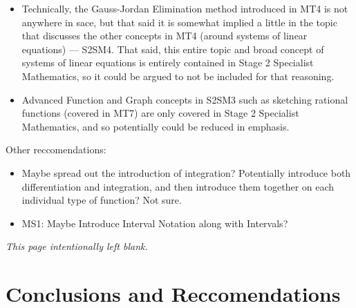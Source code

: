 \documentclass[twoside,12pt,a4paper]{report}
\makeatletter
\newcommand*{\intentionallyblankpage}{
  \vspace*{\fill}
  {\centering \textit{This page intentionally left blank.} \par}
  \vspace{\fill}}
\renewcommand*{\cleardoublepage}{\clearpage\if@twoside \ifodd\c@page\else
  \intentionallyblankpage
  \newpage
  \if@twocolumn\hbox{}\newpage\fi\fi\fi}
\makeatother
\begin{document}
\begin{itemize}
	\item Technically, the Gauss-Jordan Elimination method introduced in MT4 is not anywhere in \gls{sace}, but that said it is somewhat implied a little in the topic that discusses the other concepts in MT4 (around systems of linear equations) --- S2SM4. That said, this entire topic and broad concept of systems of linear equations is entirely contained in Stage 2 Specialist Mathematics, so it could be argued to not be included for that reasoning.
	\item Advanced Function and Graph concepts in S2SM3 such as sketching rational functions (covered in MT7) are only covered in Stage 2 Specialist Mathematics, and so potentially could be reduced in emphasis.
\end{itemize}


Other reccomendations:
\begin{itemize}
	\item Maybe spread out the introduction of integration? Potentially introduce both differentiation and integration, and then introduce them together on each individual type of function? Not sure.
\end{itemize}

\begin{itemize}
	\item MS1: Maybe Introduce Interval Notation along with Intervals?
\end{itemize}




\cleardoublepage
\chapter{Conclusions and Reccomendations}
\label{chap:recommendations}
\end{document}
